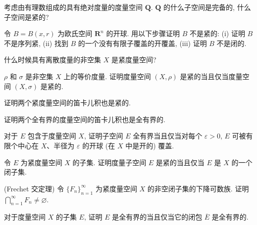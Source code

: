 \documentclass[../../main.tex]{subfiles}
\begin{document}
\begin{exercise}\label{exercise:ch09-52}
考虑由有理数组成的具有绝对度量的度量空间 $\mathbf{Q}$. $\mathbf{Q}$ 的什么子空间是完备的, 什么子空间是紧的?
\end{exercise}

\begin{exercise}\label{exercise:ch09-53}
令 $B=B(x,r)$ 为欧氏空间 $\mathbf{R}^{n}$ 的开球. 用以下步骤证明 $B$ 不是紧的: (i) 证明 $B$ 不是序列紧, (ii) 找到 $B$ 的一个没有有限子覆盖的开覆盖, (iii) 证明 $B$ 不是闭的.
\end{exercise}

\begin{exercise}\label{exercise:ch09-54}
什么时候具有离散度量的非空集 $X$ 是紧度量空间?
\end{exercise}

\begin{exercise}\label{exercise:ch09-55}
$\rho$ 和 $\sigma$ 是非空集 $X$ 上的等价度量. 证明度量空间 $(X,\rho)$ 是紧的当且仅当度量空间 $(X,\sigma)$ 是紧的.
\end{exercise}

\begin{exercise}\label{exercise:ch09-56}
证明两个紧度量空间的笛卡儿积也是紧的.
\end{exercise}

\begin{exercise}\label{exercise:ch09-57}
证明两个全有界的度量空间的笛卡儿积也是全有界的.
\end{exercise}

\begin{exercise}\label{exercise:ch09-58}
对于 $E$ 包含于度量空间 $X$, 证明子空间 $E$ 全有界当且仅当对每个 $\varepsilon>0$, $E$ 可被有限个中心在 $X$、半径为 $\varepsilon$ 的开球 (在 $X$ 中是开的) 覆盖.
\end{exercise}

\begin{exercise}\label{exercise:ch09-59}
令 $E$ 为紧度量空间 $X$ 的子集. 证明度量子空间 $E$ 是紧的当且仅当 $E$ 是 $X$ 的一个闭子集.
\end{exercise}

\begin{exercise}\label{exercise:ch09-60}
(Frechet 交定理) 令 $\{F_{n}\}_{n=1}^{\infty}$ 为紧度量空间 $X$ 的非空闭子集的下降可数族. 证明 $\bigcap_{n=1}^{\infty}F_{n}\neq\varnothing $.
\end{exercise}

\begin{exercise}\label{exercise:ch09-61}
对于度量空间 $X$ 的子集 $E$, 证明 $E$ 是全有界的当且仅当它的闭包 $\overline{E}$ 是全有界的.
\end{exercise}
\end{document}
